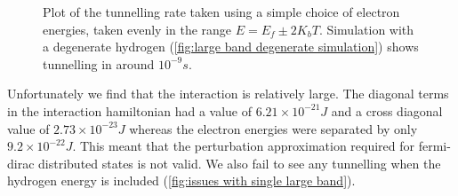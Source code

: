 \begin{figure}[htbp]
\begin{subfigure}{0.45\linewidth}
    \end{subfigure}
    \caption{Plot of the tunnelling rate taken using a
        simple choice of electron energies,
        taken evenly in the range \(E=E_f \pm 2 K_b T\).
        Simulation with a degenerate hydrogen
        (\cref{fig:large band degenerate simulation})
        shows tunnelling in around
        \(10^{-9}s\).}\label{fig:tunnelling rate single large band}
\end{figure}
Unfortunately we find that the interaction is
relatively large. The diagonal terms in
the interaction hamiltonian
had a value of \(6.21\times{}10^{-21}J\)
and a cross diagonal value of \(2.73\times{}10^{-23}J\)
whereas the electron energies were separated
by only \(9.2\times{}10^{-22}J\). This meant that
the perturbation approximation required for
fermi-dirac distributed states is not valid.
We also fail to see any tunnelling when
the hydrogen energy is included (\cref{fig:issues with single large band}).

